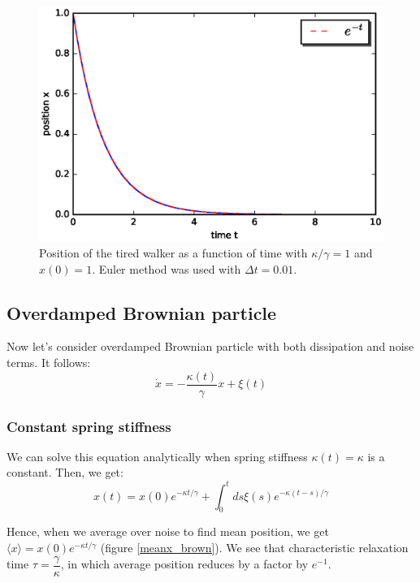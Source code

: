 \documentclass[11pt,a4paper]{article}
\begin{document}
\begin{figure}[!htbp]
\centering
\includegraphics[scale=0.67]{tired_walker.eps}
\caption{ Position of the tired walker as a function of time with $\kappa/\gamma=1$ and $x(0)=1$. Euler method was used with $\Delta t=0.01$.  }
\label{meanx_tired}
\end{figure}






\subsection*{Overdamped Brownian particle}
Now let's consider overdamped Brownian particle with both dissipation and noise terms. It follows:
\begin{equation}
\dot{x}= -\dfrac{\kappa(t)}{\gamma} x + \xi(t)
\label{eom}
\end{equation}


\subsubsection*{Constant spring stiffness}
We can solve this equation analytically when spring stiffness $\kappa(t)= \kappa$ is a constant. Then, we get: 
\begin{equation}
x(t)= x(0) e^{-\kappa t/\gamma} + \int_0^t ds  \xi(s) e^{-\kappa (t-s)/\gamma} 
\label{sol}
\end{equation}

Hence, when we average over noise to find mean position, we get $\langle x \rangle=x(0) e^{-\kappa t/\gamma}$ (figure \ref{meanx_brown}).
We see that characteristic relaxation time $\tau=\dfrac{\gamma}{\kappa}$, in which average position reduces by a factor by $e^{-1}$.
\end{document}
